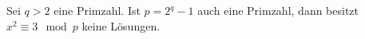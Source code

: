
\begin{exercise}

Sei $q > 2$ eine Primzahl. Ist $p = 2^q - 1$ auch eine Primzahl, dann 
besitzt $x^2 \equiv 3 \mod{p}$ keine Lösungen.
\end{exercise}


\begin{solution}

\phantom{}

\end{solution}

